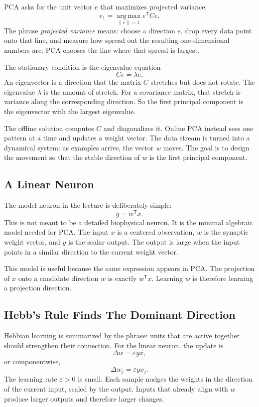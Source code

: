 PCA asks for the unit vector \(e\) that maximizes projected variance:
\[
  e_1
  =
  \operatorname*{arg\,max}_{\|e\|=1}
  e^{\mathsf{T}}Ce.
\]
The phrase \emph{projected variance} means: choose a direction \(e\), drop every data point onto that line, and measure how spread out the resulting one-dimensional numbers are. PCA chooses the line where that spread is largest.

The stationary condition is the eigenvalue equation
\[
  Ce=\lambda e.
\]
An eigenvector is a direction that the matrix \(C\) stretches but does not rotate. The eigenvalue \(\lambda\) is the amount of stretch. For a covariance matrix, that stretch is variance along the corresponding direction. So the first principal component is the eigenvector with the largest eigenvalue.

The offline solution computes \(C\) and diagonalizes it. Online PCA instead sees one pattern at a time and updates a weight vector. The data stream is turned into a dynamical system: as examples arrive, the vector \(w\) moves. The goal is to design the movement so that the stable direction of \(w\) is the first principal component.

\subsection{A Linear Neuron}

The model neuron in the lecture is deliberately simple:
\[
  y=w^{\mathsf{T}}x.
\]
This is not meant to be a detailed biophysical neuron. It is the minimal algebraic model needed for PCA. The input \(x\) is a centered observation, \(w\) is the synaptic weight vector, and \(y\) is the scalar output. The output is large when the input points in a similar direction to the current weight vector.

This model is useful because the same expression appears in PCA. The projection of \(x\) onto a candidate direction \(w\) is exactly \(w^{\mathsf{T}}x\). Learning \(w\) is therefore learning a projection direction.

\subsection{Hebb's Rule Finds The Dominant Direction}

Hebbian learning is summarized by the phrase: units that are active together should strengthen their connection. For the linear neuron, the update is
\[
  \Delta w
  =
  \varepsilon yx,
\]
or componentwise,
\[
  \Delta w_j
  =
  \varepsilon yx_j.
\]
The learning rate \(\varepsilon>0\) is small. Each sample nudges the weights in the direction of the current input, scaled by the output. Inputs that already align with \(w\) produce larger outputs and therefore larger changes.

